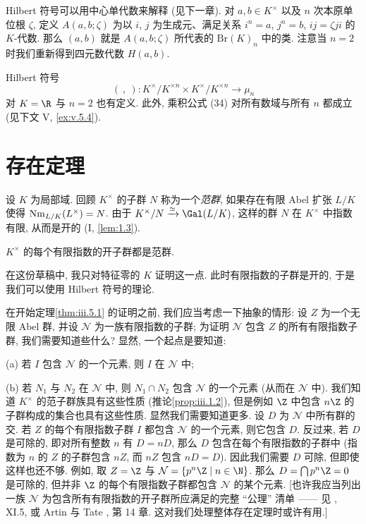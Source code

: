 \begin{remark}\label{rem:iii.4.7}
Hilbert 符号可以用中心单代数来解释 (见下一章). 对 $a,b\in K^\times$ 以及 $n$ 次本原单位根 $\zeta$, 定义 $A(a,b;\zeta)$ 为以 $i$, $j$ 为生成元、满足关系 $i^n=a$, $j^n=b$, $ij=\zeta ji$ 的 $K$-代数. 那么 $(a,b)$ 就是 $A(a,b;\zeta)$ 所代表的 $\mathrm{Br}(K)_n$ 中的类. 注意当 $n=2$ 时我们重新得到四元数代数 $H(a,b)$.
\end{remark}

\begin{remark}\label{rem:iii.4.8}
Hilbert 符号
\[
 (\ ,\ )\colon K^\times/K^{\times n}\times K^\times/K^{\times n}\to\mu_n
\]
对 $K=\R$ 与 $n=2$ 也有定义. 此外, 乘积公式 (34) 对所有数域与所有 $n$ 都成立 (见下文 V, \ref{ex:v.5.4}).
\end{remark}

\section{存在定理}\label{sec:III.5}

设 $K$ 为局部域. 回顾 $K^\times$ 的子群 $N$ 称为一个\emph{范群}, 如果存在有限 Abel 扩张 $L/K$ 使得 $\operatorname{Nm}_{L/K}(L^\times)=N$. 由于 $K^\times/N\xrightarrow{\simeq}\Gal(L/K)$, 这样的群 $N$ 在 $K^\times$ 中指数有限, 从而是开的 (I, \ref{lem:1.3}).

\begin{theorem}[存在定理]\label{thm:iii.5.1}
$K^\times$ 的每个有限指数的开子群都是范群.
\end{theorem}

在这份草稿中, 我只对特征零的 $K$ 证明这一点. 此时有限指数的子群是开的, 于是我们可以使用 Hilbert 符号的理论.

\begin{remark}\label{rem:iii.5.2}
在开始定理\ref{thm:iii.5.1} 的证明之前, 我们应当考虑一下抽象的情形: 设 $Z$ 为一个无限 Abel 群, 并设 $\mathcal{N}$ 为一族有限指数的子群; 为证明 $\mathcal{N}$ 包含 $Z$ 的所有有限指数子群, 我们需要知道些什么? 显然, 一个起点是要知道:

(a) 若 $I$ 包含 $\mathcal{N}$ 的一个元素, 则 $I$ 在 $\mathcal{N}$ 中;

(b) 若 $N_1$ 与 $N_2$ 在 $\mathcal{N}$ 中, 则 $N_1\cap N_2$ 包含 $\mathcal{N}$ 的一个元素 (从而在 $\mathcal{N}$ 中). 我们知道 $K^\times$ 的范子群族具有这些性质 (推论\ref{prop:iii.1.2}), 但是例如 $\Z$ 中包含 $n\Z$ 的子群构成的集合也具有这些性质. 显然我们需要知道更多. 设 $D$ 为 $\mathcal{N}$ 中所有群的交. 若 $Z$ 的每个有限指数子群 $I$ 都包含 $\mathcal{N}$ 的一个元素, 则它包含 $D$. 反过来, 若 $D$ 是可除的, 即对所有整数 $n$ 有 $D=nD$, 那么 $D$ 包含在每个有限指数的子群中 (指数为 $n$ 的 $Z$ 的子群包含 $nZ$, 而 $nZ$ 包含 $nD=D$). 因此我们需要 $D$ 可除, 但即使这样也还不够. 例如, 取 $Z=\Z$ 与 $\mathcal{N}=\{p^n\Z\mid n\in\N\}$. 那么 $D=\bigcap p^n\Z=0$ 是可除的, 但并非 $\Z$ 的每个有限指数子群都包含 $\mathcal{N}$ 的某个元素. [也许我应当列出一族 $\mathcal{N}$ 为包含所有有限指数的开子群所应满足的完整 ``公理'' 清单 —— 见 \cite{Serre1962}, XI.5, 或 Artin 与 Tate \citeyear{ArtinTate1961}, 第 14 章. 这对我们处理整体存在定理时或许有用.]
\end{remark}

